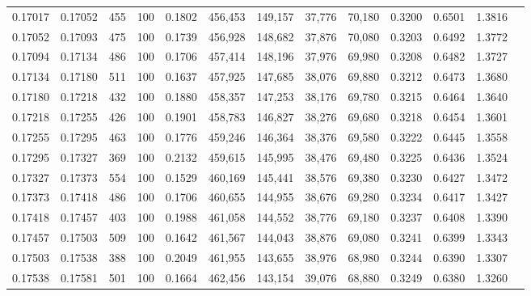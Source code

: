 \begin{tabular}{rrrrrrrrrrrrr}
0.17017 & 0.17052 &   455 & 100 &                                     0.1802 & 456,453 & 149,157 &  37,776 &  70,180 & 0.3200 & 0.6501 & 1.3816 \\
0.17052 & 0.17093 &   475 & 100 &                                     0.1739 & 456,928 & 148,682 &  37,876 &  70,080 & 0.3203 & 0.6492 & 1.3772 \\
0.17094 & 0.17134 &   486 & 100 &                                     0.1706 & 457,414 & 148,196 &  37,976 &  69,980 & 0.3208 & 0.6482 & 1.3727 \\
0.17134 & 0.17180 &   511 & 100 &                                     0.1637 & 457,925 & 147,685 &  38,076 &  69,880 & 0.3212 & 0.6473 & 1.3680 \\
0.17180 & 0.17218 &   432 & 100 &                                     0.1880 & 458,357 & 147,253 &  38,176 &  69,780 & 0.3215 & 0.6464 & 1.3640 \\
0.17218 & 0.17255 &   426 & 100 &                                     0.1901 & 458,783 & 146,827 &  38,276 &  69,680 & 0.3218 & 0.6454 & 1.3601 \\
0.17255 & 0.17295 &   463 & 100 &                                     0.1776 & 459,246 & 146,364 &  38,376 &  69,580 & 0.3222 & 0.6445 & 1.3558 \\
0.17295 & 0.17327 &   369 & 100 &                                     0.2132 & 459,615 & 145,995 &  38,476 &  69,480 & 0.3225 & 0.6436 & 1.3524 \\
0.17327 & 0.17373 &   554 & 100 &                                     0.1529 & 460,169 & 145,441 &  38,576 &  69,380 & 0.3230 & 0.6427 & 1.3472 \\
0.17373 & 0.17418 &   486 & 100 &                                     0.1706 & 460,655 & 144,955 &  38,676 &  69,280 & 0.3234 & 0.6417 & 1.3427 \\
0.17418 & 0.17457 &   403 & 100 &                                     0.1988 & 461,058 & 144,552 &  38,776 &  69,180 & 0.3237 & 0.6408 & 1.3390 \\
0.17457 & 0.17503 &   509 & 100 &                                     0.1642 & 461,567 & 144,043 &  38,876 &  69,080 & 0.3241 & 0.6399 & 1.3343 \\
0.17503 & 0.17538 &   388 & 100 &                                     0.2049 & 461,955 & 143,655 &  38,976 &  68,980 & 0.3244 & 0.6390 & 1.3307 \\
0.17538 & 0.17581 &   501 & 100 &                                     0.1664 & 462,456 & 143,154 &  39,076 &  68,880 & 0.3249 & 0.6380 & 1.3260 \\

\end{tabular}
